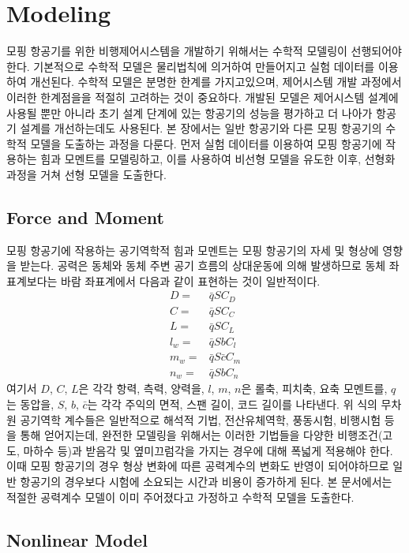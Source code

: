 \documentclass[a4paper, 12pt]{report}
\begin{document}
	\chapter{Modeling}
	
	모핑 항공기를 위한 비행제어시스템을 개발하기 위해서는 수학적 모델링이 선행되어야 한다. 
	기본적으로 수학적 모델은 물리법칙에 의거하여 만들어지고 실험 데이터를 이용하여 개선된다. 
	수학적 모델은 분명한 한계를 가지고있으며, 제어시스템 개발 과정에서 이러한 한계점을을 적절히 고려하는 것이 중요하다.
	개발된 모델은 제어시스템 설계에 사용될 뿐만 아니라 초기 설계 단계에 있는 항공기의 성능을 평가하고 더 나아가 항공기 설계를 개선하는데도 사용된다.
	본 장에서는 일반 항공기와 다른 모핑 항공기의 수학적 모델을 도출하는 과정을 다룬다.
	먼저 실험 데이터를 이용하여 모핑 항공기에 작용하는 힘과 모멘트를 모델링하고, 이를 사용하여 비선형 모델을 유도한 이후, 선형화 과정을 거쳐 선형 모델을 도출한다.
	
	\section{Force and Moment}
	
	모핑 항공기에 작용하는 공기역학적 힘과 모멘트는 모핑 항공기의 자세 및 형상에 영향을 받는다.
	공력은 동체와 동체 주변 공기 흐름의 상대운동에 의해 발생하므로 동체 좌표계보다는 바람 좌표계에서 다음과 같이 표현하는 것이 일반적이다.
	\begin{align}
		D =& \bar{q}SC_D \\
		C =& \bar{q}SC_C \\
		L =& \bar{q}SC_L \\
		l_w =& \bar{q}SbC_l \\
		m_w =& \bar{q}S\bar{c}C_m \\
		n_w =& \bar{q}SbC_n
	\end{align}
	여기서 $D$, $C$, $L$은 각각 항력, 측력, 양력을, $l$, $m$, $n$은 롤축, 피치축, 요축 모멘트를, $q$는 동압을, $S$, $b$, $\bar{c}$는 각각 주익의 면적, 스팬 길이, 코드 길이를 나타낸다.
	위 식의 무차원 공기역학 계수들은 일반적으로 해석적 기법, 전산유체역학, 풍동시험, 비행시험 등을 통해 얻어지는데, 완전한 모델링을 위해서는 이러한 기법들을 다양한 비행조건(고도, 마하수 등)과 받음각 및 옆미끄럼각을 가지는 경우에 대해 폭넓게 적용해야 한다.
	이때 모핑 항공기의 경우 형상 변화에 따른 공력계수의 변화도 반영이 되어야하므로 일반 항공기의 경우보다 시험에 소요되는 시간과 비용이 증가하게 된다.
	본 문서에서는 적절한 공력계수 모델이 이미 주어졌다고 가정하고 수학적 모델을 도출한다.
	
	\section{Nonlinear Model}
	
\end{document}
